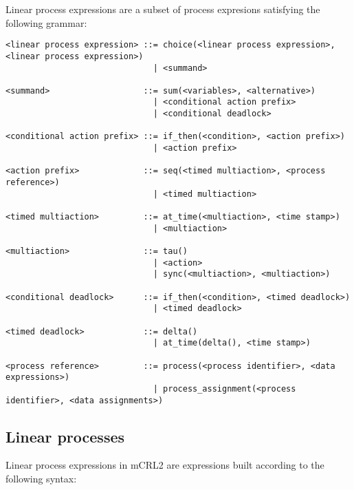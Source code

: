 \documentclass{article}
\begin{document}
Linear process expressions are a subset of process expresions satisfying the
following grammar:
\begin{verbatim}
<linear process expression> ::= choice(<linear process expression>, <linear process expression>)
                              | <summand>
 
<summand>                   ::= sum(<variables>, <alternative>)
                              | <conditional action prefix>
                              | <conditional deadlock>
 
<conditional action prefix> ::= if_then(<condition>, <action prefix>)
                              | <action prefix>
 
<action prefix>             ::= seq(<timed multiaction>, <process reference>)
                              | <timed multiaction>
 
<timed multiaction>         ::= at_time(<multiaction>, <time stamp>)
                              | <multiaction>
 
<multiaction>               ::= tau()
                              | <action>
                              | sync(<multiaction>, <multiaction>)
 
<conditional deadlock>      ::= if_then(<condition>, <timed deadlock>)
                              | <timed deadlock>
 
<timed deadlock>            ::= delta()
                              | at_time(delta(), <time stamp>)
 
<process reference>         ::= process(<process identifier>, <data expressions>)
                              | process_assignment(<process identifier>, <data assignments>)
\end{verbatim}

\pagebreak

\subsection{Linear processes}

Linear process expressions in mCRL2 are expressions built according to the
following syntax:
\end{document}
